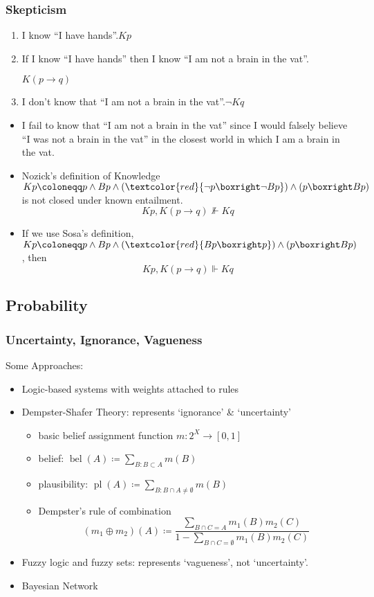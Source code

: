 \documentclass[UTF8,11pt,colorlinks,compress,openany]{beamer}%
\begin{document}
\begin{frame}\frametitle{Skepticism}
\begin{enumerate}[$S_1$]
	\item I know ``I have hands''.\hfill $Kp$
	\item If I know ``I have hands'' then I know ``I am not a brain in the vat''.\par\hfill $K(p\to q)$
	\item I don't know that ``I am not a brain in the vat''.\hfill $\neg Kq$
\end{enumerate}
\begin{itemize}
	\item I fail to know that ``I am not a brain in the vat'' since I would falsely believe ``I was not a brain in the vat'' in the closest world in which I am a brain in the vat.
	\item Nozick's definition of Knowledge $Kp\coloneqq p\wedge Bp\wedge (\textcolor{red}{\neg p\boxright\neg Bp})\wedge (p\boxright Bp)$ is not closed under known entailment.
	\[Kp,K(p\to q)\nVdash Kq\]
	\item If we use Sosa's definition, $Kp\coloneqq p\wedge Bp\wedge (\textcolor{red}{Bp\boxright p})\wedge (p\boxright Bp)$, then 
	\[Kp,K(p\to q)\Vdash Kq\]
\end{itemize}
\end{frame}

\subsection{Probability}

\begin{frame}\frametitle{Uncertainty, Ignorance, Vagueness}
Some Approaches:
\begin{itemize}
	\item Logic-based systems with weights attached to rules
	\item Dempster-Shafer Theory: represents `ignorance' \& `uncertainty'
	\begin{itemize}
		\item basic belief assignment function $m:2^X\to[0,1]$
		\item belief: $\operatorname{bel}(A)\coloneqq\sum\limits_{{B: B\subset A}}m(B)$
		\item plausibility: $\operatorname{pl}(A)\coloneqq\sum\limits_{{B: B\cap A\ne\emptyset}}m(B)$
		\item Dempster's rule of combination
		\[(m_1\oplus m_2)(A)\coloneqq\frac{\sum\limits_{B\cap C=A}m_1(B)m_2(C)}{1-\sum\limits_{{B\cap C=\emptyset}}m_1(B)m_2(C)}\]
	\end{itemize}
	\item Fuzzy logic and fuzzy sets: represents `vagueness', not `uncertainty'.
	\item Bayesian Network
\end{itemize}
\end{frame}
\end{document}
